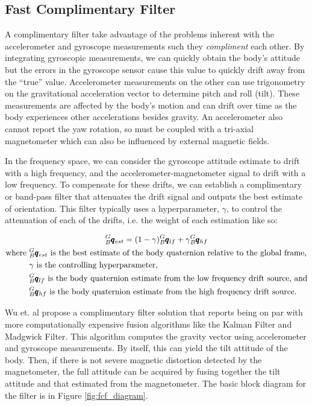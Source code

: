 \subsection{Fast Complimentary Filter} 
A complimentary filter take advantage of the problems inherent with the accelerometer and gyroscope measurements such they \textit{compliment} each other.
By integrating gyroscopic measurements, we can quickly obtain the body's attitude but the errors in the gyroscope sensor cause this value to quickly drift away from the ``true'' value.
Accelerometer measurements on the other can use trigonometry on the gravitational acceleration vector to determine pitch and roll (tilt).
These measurements are affected by the body's motion and can drift over time as the body experiences other accelerations besides gravity.
An accelerometer also cannot report the yaw rotation, so must be coupled with a tri-axial magnetometer which can also be influenced by external magnetic fields.

In the frequency space, we can consider the gyroscope attitude estimate to drift with a high frequency, and the accelerometer-magnetometer signal to drift with a low frequency.
To compensate for these drifts, we can establish a complimentary or band-pass filter that attenuates the drift signal and outputs the best estimate of orientation.
This filter typically uses a hyperparameter, $\gamma$, to control the attenuation of each of the drifts, i.e. the weight of each estimation like so:

\begin{gather} \labeq{fcf}
    {}^G_B\pmb{q}_{est} = (1-\gamma){}^G_B\pmb{q}_{lf} + \gamma {}^G_B\pmb{q}_{hf} \\
    \begin{aligned}
        \text{where } &{}^G_B\pmb{q}_{est} \text{ is the best estimate of the body quaternion relative to the global frame,} \\
                      &\gamma \text{ is the controlling hyperparameter, } \\
                      &{}^G_B\pmb{q}_{lf} \text{ is the body quaternion estimate from the low frequency drift source, and} \\
                      &{}^G_B\pmb{q}_{hf} \text{ is the body quaternion estimate from the high frequency drift source.}
    \end{aligned} \notag
\end{gather}

Wu et. al \cite{FCF:2016} propose a complimentary filter solution that reports being on par with more computationally expensive fusion algorithms like the Kalman Filter and Madgwick Filter.
This algorithm computes the gravity vector using accelerometer and gyroscope measurements.
By itself, this can yield the tilt attitude of the body.
Then, if there is not severe magnetic distortion detected by the magnetometer, the full attitude can be acquired by fusing together the tilt attitude and that estimated from the magnetometer.
The basic block diagram for the filter is in Figure \ref{fig:fcf_diagram}.


